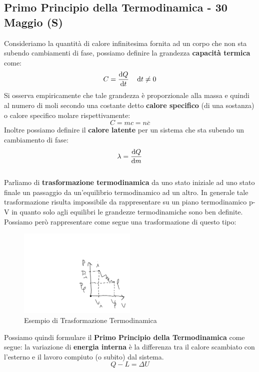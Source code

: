 \documentclass{article}
\begin{document}
\subsection{Primo Principio della Termodinamica - 30 Maggio (S)}
Consideriamo la quantità di calore infinitesima fornita ad un corpo che non sta subendo cambiamenti di fase, possiamo definire la grandezza \textbf{capacità termica} come:
\[C=\dv{Q}{t}\quad\dif t\neq 0\]
Si osserva empiricamente che tale grandezza è proporzionale alla massa e quindi al numero di moli secondo una costante detto \textbf{calore specifico} (di una sostanza) o calore specifico molare rispettivamente:
\[C=mc=n\overline{c}\]
Inoltre possiamo definire il \textbf{calore latente} per un sistema che sta subendo un cambiamento di fase:
\[\lambda=\dv{Q}{m}\]\\
Parliamo di \textbf{trasformazione termodinamica} da uno stato iniziale ad uno stato finale un passaggio da un'equilibrio termodinamico ad un altro. In generale tale trasformazione risulta impossibile da rappresentare su un piano termodinamico p-V in quanto solo agli equilibri le grandezze termodinamiche sono ben definite. Possiamo però rappresentare come segue una trasformazione di questo tipo:
\begin{figure}[H]
    \centering
    \includegraphics[width=0.5\textwidth]{TrasformazioneIrreversibile.png}
    \caption{Esempio di Trasformazione Termodinamica}
    \label{TrasfIrrev}
\end{figure}
Possiamo quindi formulare il \textbf{Primo Principio della Termodinamica} come segue: la variazione di \textbf{energia interna} è la differenza tra il calore scambiato con l'esterno e il lavoro compiuto (o subito) dal sistema.
\begin{equation}
    \boxed{Q-L=\Delta U}
\end{equation}
\end{document}
